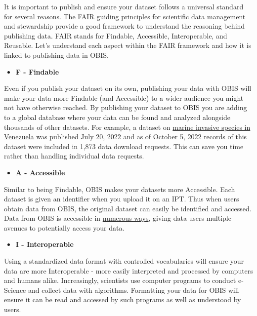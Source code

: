 \documentclass[
  letterpaper,
  DIV=11,
  numbers=noendperiod,
  oneside]{scrreprt}
\providecommand{\tightlist}{%
  \setlength{\itemsep}{0pt}\setlength{\parskip}{0pt}}\usepackage{longtable,booktabs,array}
\begin{document}
It is important to publish and ensure your dataset follows a universal
standard for several reasons. The
\href{https://www.nature.com/articles/sdata201618}{FAIR guiding
principles} for scientific data management and stewardship provide a
good framework to understand the reasoning behind publishing data. FAIR
stands for Findable, Accessible, Interoperable, and Reusable. Let's
understand each aspect within the FAIR framework and how it is linked to
publishing data in OBIS.

\begin{itemize}
\tightlist
\item
  \textbf{F - Findable}
\end{itemize}

Even if you publish your dataset on its own, publishing your data with
OBIS will make your data more Findable (and Accessible) to a wider
audience you might not have otherwise reached. By publishing your
dataset to OBIS you are adding to a global database where your data can
be found and analyzed alongside thousands of other datasets. For
example, a dataset on
\href{https://obis.org/dataset/98ea98e8-356b-4dd5-87c6-4eeb7e3cf588}{marine
invasive species in Venezuela} was published July 20, 2022 and as of
October 5, 2022 records of this dataset were included in 1,873 data
download requests. This can save you time rather than handling
individual data requests.

\begin{itemize}
\tightlist
\item
  \textbf{A - Accessible}
\end{itemize}

Similar to being Findable, OBIS makes your datasets more Accessible.
Each dataset is given an identifier when you upload it on an IPT. Thus
when users obtain data from OBIS, the original dataset can easily be
identified and accessed. Data from OBIS is accessible in
\href{access.html}{numerous ways}, giving data users multiple avenues to
potentially access your data.

\begin{itemize}
\tightlist
\item
  \textbf{I - Interoperable}
\end{itemize}

Using a standardized data format with controlled vocabularies will
ensure your data are more Interoperable - more easily interpreted and
processed by computers and humans alike. Increasingly, scientists use
computer programs to conduct e-Science and collect data with algorithms.
Formatting your data for OBIS will ensure it can be read and accessed by
such programs as well as understood by users.
\end{document}
